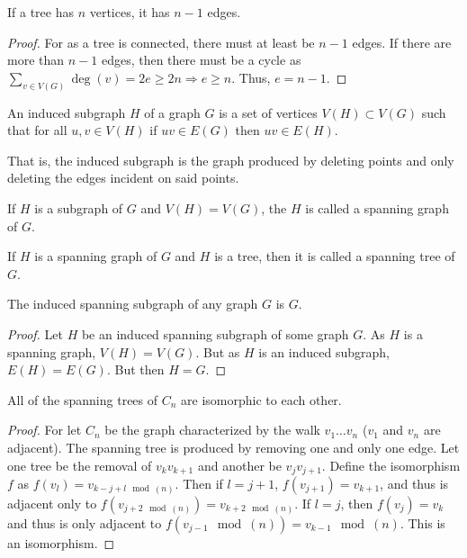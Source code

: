         \begin{theorem}
        If a tree has $n$ vertices, it has $n-1$ edges.
        \end{theorem}
        \begin{proof} For as a tree is connected, there must at least be $n-1$ edges. If there are more than $n-1$ edges, then there must be a cycle as $\sum_{v\in V(G)} \deg(v) = 2e \geq 2n\Rightarrow e\geq n$. Thus, $e=n-1$. 
        \end{proof}
        \begin{definition}
        An induced subgraph $H$ of a graph $G$ is a set of vertices $V(H) \subset V(G)$ such that for all $u,v\in V(H)$ if $uv\in E(G)$ then $uv \in E(H)$.
        \end{definition}
        \begin{remark}
        That is, the induced subgraph is the graph produced by deleting points and only deleting the edges incident on said points.
        \end{remark}
        \begin{definition}
        If $H$ is a subgraph of $G$ and $V(H)=V(G)$, the $H$ is called a spanning graph of $G$.
        \end{definition}
        \begin{definition}
        If $H$ is a spanning graph of $G$ and $H$ is a tree, then it is called a spanning tree of $G$.
        \end{definition}
        \begin{corollary}
        The induced spanning subgraph of any graph $G$ is $G$.
        \end{corollary}
        \begin{proof}
        Let $H$ be an induced spanning subgraph of some graph $G$. As $H$ is a spanning graph, $V(H)=V(G)$. But as $H$ is an induced subgraph, $E(H)=E(G)$. But then $H=G$.
        \end{proof}
        \begin{theorem}
        All of the spanning trees of $C_n$ are isomorphic to each other.
        \end{theorem}
        \begin{proof}
        For let $C_n$ be the graph characterized by the walk $v_1\hdots v_n$ ($v_1$ and $v_n$ are adjacent). The spanning tree is produced by removing one and only one edge. Let one tree be the removal of $v_{k}v_{k+1}$ and another be $v_{j}v_{j+1}$. Define the isomorphism $f$ as $f(v_l) = v_{k-j+l \mod(n)}$. Then if $l=j+1$, $f(v_{j+1}) = v_{k+1}$, and thus is adjacent only to $f(v_{j+2 \mod(n)}) = v_{k+2\mod(n)}$. If $l=j$, then $f(v_j) = v_k$ and thus is only adjacent to $f(v_{j-1}\mod(n)) = v_{k-1}\mod(n)$. This is an isomorphism.
        \end{proof}
